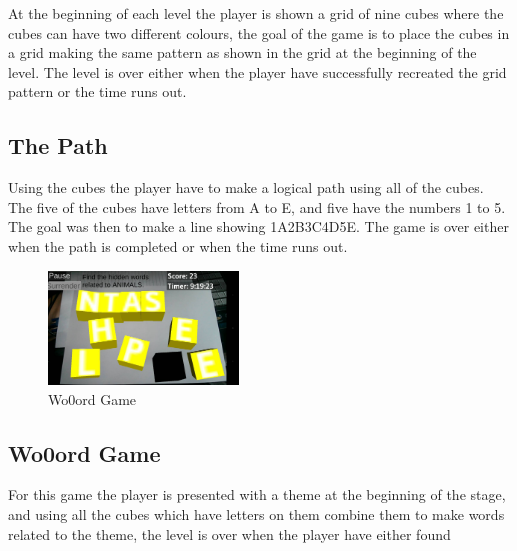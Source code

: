 At the beginning of each level the player is shown a grid of nine cubes where the cubes can have two different colours, the goal of the game is to place the cubes in a grid making the same pattern as shown in the grid at the beginning of the level. The level is over either when the player have successfully recreated the grid pattern or the time runs out.


\subsection{The Path}
	\label{game:the_path}

Using the cubes the player have to make a logical path using all of the cubes. The five of the cubes have letters from A to E, and five have the numbers 1 to 5. The goal was then to make a line showing 1A2B3C4D5E. The game is over either when the path is completed or when the time runs out.


\begin{figure}
	\capstart
	\centering
	\vspace{-20px}
	\includegraphics[width=0.45\textwidth]{images/Wo0ords_screenshot.jpg}
	\vspace{-10pt}
	\caption{Wo0ord Game}
	\label{fig:Costas_wo0ords}
	\vspace{-20pt}
\end{figure}


\subsection{Wo0ord Game}
	\label{game:wo0ord_game}
	
For this game the player is presented with a theme at the beginning of the stage, and using all the cubes which have letters on them combine them to make words related to the theme, the level is over when the player have either found 